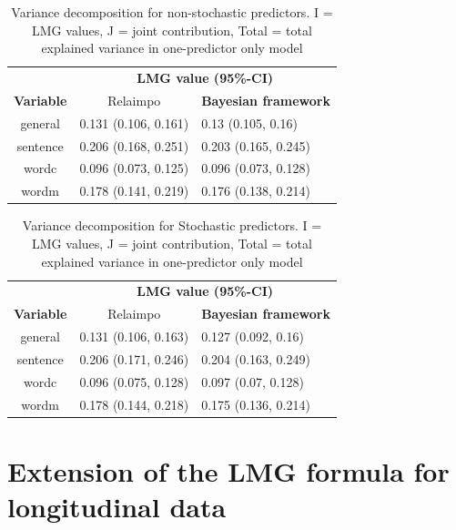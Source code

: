 \documentclass[11pt,a4paper,twoside]{book}\usepackage[]{graphicx}\usepackage[]{color}
\begin{document}
\begin{table}[h]
\caption{Variance decomposition for non-stochastic predictors. I = LMG values, J = joint contribution, Total = total explained variance in one-predictor only model}
\centering
\begin{tabular}{cll}
   \toprule
   &\multicolumn{2}{c}{\textbf{LMG value (95\%-CI)}} \\
 \textbf{Variable} & \multicolumn{1}{c}{Relaimpo} & \textbf{Bayesian framework}  \\
  \hline
general & 0.131 (0.106, 0.161)  & 0.13 (0.105, 0.16)  \\ 
sentence & 0.206 (0.168, 0.251)  & 0.203 (0.165, 0.245)   \\ 
wordc & 0.096 (0.073, 0.125)  & 0.096 (0.073, 0.128)  \\ 
wordm & 0.178 (0.141, 0.219) & 0.176 (0.138, 0.214)  \\ 
   \bottomrule
\end{tabular}
\label{tbl:empirical.relaimp.comp}
\end{table}





\begin{table}[h]
\caption{Variance decomposition for Stochastic predictors. I = LMG values, J = joint contribution, Total = total explained variance in one-predictor only model}
\centering
\begin{tabular}{cll}
   \toprule
   &\multicolumn{2}{c}{\textbf{LMG value (95\%-CI)}} \\
 \textbf{Variable} & \multicolumn{1}{c}{Relaimpo} & \textbf{Bayesian framework}  \\
  \hline
general & 0.131 (0.106, 0.163)  &  0.127 (0.092, 0.16)  \\ 
sentence & 0.206 (0.171, 0.246)  &  0.204 (0.163, 0.249)   \\ 
wordc & 0.096 (0.075, 0.128)  &  0.097 (0.07, 0.128)  \\ 
wordm & 0.178 (0.144, 0.218) &  0.175 (0.136, 0.214) \\ 
   \bottomrule
\end{tabular}
\label{tbl:empirical.relaimp.comp.stoch}
\end{table}







\chapter{Extension of the LMG formula for longitudinal data}
\end{document}
